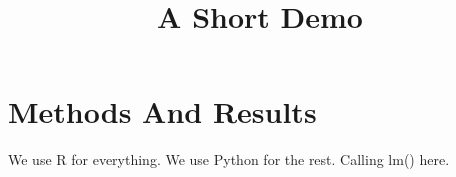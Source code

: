 \documentclass[article]{jss}
\title{A Short Demo}
\begin{document}
\section{Methods And Results}
We use R for everything. %
We use Python for the rest.
Calling lm() here. %
\end{document}
